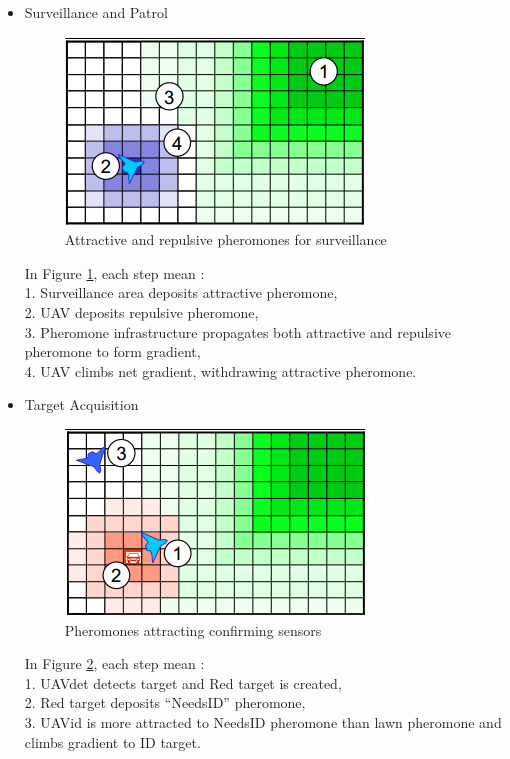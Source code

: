 \begin{itemize}
\item Surveillance and Patrol

\begin{figure}[h]
\center
\includegraphics[scale=0.7]{../images/pheromone_surveillance.png}
\caption{\label{surveillance}Attractive and repulsive pheromones for surveillance\cite{PerformanceOfDigitalPheromones10}}
\end{figure}

In Figure \ref{surveillance}, each step mean :\\
 1. Surveillance area deposits attractive pheromone,\\
 2. UAV deposits repulsive pheromone,\\ 
 3. Pheromone infrastructure propagates both attractive and repulsive pheromone to form gradient,\\
 4. UAV climbs net gradient, withdrawing attractive pheromone.
 
\newpage
 
\item Target Acquisition

\begin{figure}[h]
\center
\includegraphics[scale=0.7]{../images/pheromone_target_acquisition.png}
\caption{\label{targetacquisition}Pheromones attracting confirming sensors\cite{PerformanceOfDigitalPheromones10}}
\end{figure}

In Figure \ref{targetacquisition}, each step mean :\\
1. UAVdet detects target and Red target is created,\\
2. Red target deposits “NeedsID” pheromone, \\
3. UAVid is more attracted to NeedsID pheromone than lawn pheromone and climbs gradient to ID target.


\end{itemize}
